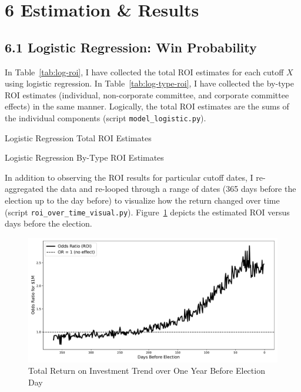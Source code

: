 \section*{6 Estimation \& Results}

\subsection*{6.1 Logistic Regression: Win Probability}

In Table~\ref{tab:log-roi}, I have collected the total ROI estimates for each cutoff $X$ using logistic regression. In Table~\ref{tab:log-type-roi}, I have collected the by-type ROI estimates (individual, non-corporate committee, and corporate committee effects) in the same manner. Logically, the total ROI estimates are the sums of the individual components (script \texttt{model\_logistic.py}).

\begin{table}[H]
	\centering
	
	\caption{Logistic Regression Total ROI Estimates}
	\label{tab:log-roi}
\end{table}

\begin{table}[H]
	\centering
	
	\caption{Logistic Regression By-Type ROI Estimates}
	\label{tab:log-type-roi}
\end{table}

In addition to observing the ROI results for particular cutoff dates, I re-aggregated the data and re-looped through a range of dates (365 days before the election up to the day before) to visualize how the return changed over time (script \texttt{roi\_over\_time\_visual.py}). Figure~\ref{fig:roi-year} depicts the estimated ROI versus days before the election.

\begin{figure}[H]
	\centering
	\includegraphics[width = 0.8\linewidth]{../Figures/roi_over_time.pdf}
	\caption{Total Return on Investment Trend over One Year Before Election Day}
	\label{fig:roi-year}
\end{figure}


